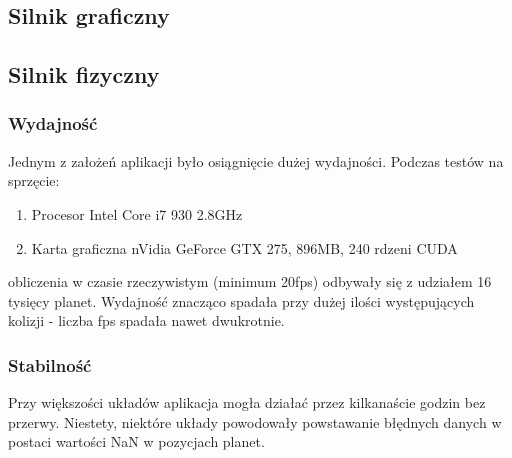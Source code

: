 \subsection{Silnik graficzny}\label{sub:silnik graficzny}

\subsection{Silnik fizyczny}\label{sub:silnik fizyczny}
\subsubsection{Wydajność}
Jednym z założeń aplikacji było osiągnięcie dużej wydajności. Podczas testów na sprzęcie:
\begin{enumerate}
\item{Procesor Intel Core i7 930 2.8GHz}
\item{Karta graficzna nVidia GeForce GTX 275, 896MB, 240 rdzeni CUDA}
\end{enumerate}
obliczenia w czasie rzeczywistym (minimum 20fps) odbywały się z udziałem 16 tysięcy planet. Wydajność znacząco spadała przy dużej ilości występujących kolizji - liczba fps spadała nawet dwukrotnie.

\subsubsection{Stabilność}
Przy większości układów aplikacja mogła działać przez kilkanaście godzin bez przerwy. Niestety, niektóre układy powodowały powstawanie błędnych danych w postaci wartości NaN w pozycjach planet.
